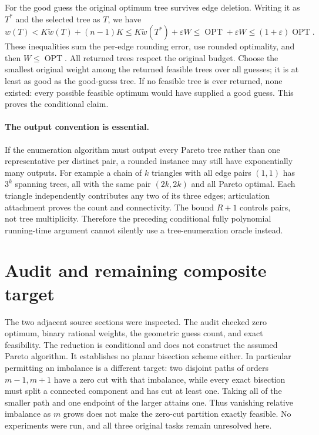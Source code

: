 \documentclass[11pt]{article}
\begin{document}
For the good guess the original optimum tree survives edge deletion.
Writing it as $T^*$ and the selected tree as $T$, we have
\[
w(T)<K\widetilde w(T)+(n-1)K
\le K\widetilde w(T^*)+\varepsilon W
\le\operatorname{OPT}+\varepsilon W
\le(1+\varepsilon)\operatorname{OPT}.
\]
These inequalities sum the per-edge rounding error, use rounded
optimality, and then $W\le\operatorname{OPT}$. All returned
trees respect the original budget. Choose the smallest original
weight among the returned feasible trees over all guesses; it
is at least as good as the good-guess tree. If no feasible
tree is ever returned, none existed: every possible feasible optimum
would have supplied a good guess. This proves the conditional claim.

\paragraph{The output convention is essential.}
If the enumeration algorithm must output every Pareto tree rather
than one representative per distinct pair, a rounded instance may
still have exponentially many outputs. For example a chain of
$k$ triangles with all edge pairs $(1,1)$ has $3^k$
spanning trees, all with the same pair $(2k,2k)$ and all
Pareto optimal. Each triangle independently contributes any two of
its three edges; articulation attachment proves the count and
connectivity. The bound $R+1$ controls pairs, not tree multiplicity.
Therefore the preceding conditional fully polynomial running-time
argument cannot silently use a tree-enumeration oracle instead.

\section{Audit and remaining composite target}
The two adjacent source sections were inspected. The audit checked
zero optimum, binary rational weights, the geometric guess count,
and exact feasibility. The reduction is conditional and does not
construct the assumed Pareto algorithm. It establishes no planar
bisection scheme either. In particular permitting an imbalance is
a different target: two disjoint paths of orders $m-1,m+1$
have a zero cut with that imbalance, while every exact bisection
must split a connected component and has cut at least one.
Taking all of the smaller path and one endpoint of the larger
attains one. Thus vanishing relative imbalance as $m$ grows
does not make the zero-cut partition exactly feasible. No experiments
were run, and all three original tasks remain unresolved here.
\end{document}
